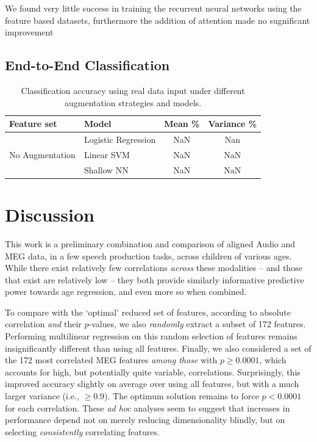 \documentclass[utf8]{frontiersSCNS} %
\begin{document}
We found very little success in training the recurrent neural networks using the feature based datasets, furthermore the addition of attention made no sugnificant improvement 
  

\subsection{End-to-End Classification}

\begin{table}[t]
  \centering
  \label{tab:end2end_results}
  \begin{tabular}{l l | c | c}
    \textbf{Feature set} & Model & \textbf{Mean \%} & \textbf{Variance \%} \\
    \toprule
    \multirow{3}{*}{No Augmentation}
    & Logistic Regression & NaN & Nan  \\
    & Linear SVM          & NaN & NaN  \\
    & Shallow NN          & NaN & NaN  \\
    \midrule

    \bottomrule
  \end{tabular}
  \caption{Classification accuracy using real data input under different augmentation strategies and models.}
\end{table}

\section{Discussion}


This work is a preliminary combination and comparison of aligned Audio and MEG data, in a few speech production tasks, across children of various ages. While there exist relatively few correlations {\em across} these modalities -- and those that exist are relatively low -- they both provide similarly informative predictive power towards age regression, and even more so when combined.

To compare with the `optimal' reduced set of features, according to absolute correlation {\em and} their $p$-values, we also {\em randomly} extract a subset of 172 features. Performing multilinear regression on this random selection of features remains insignificantly different than using all features. Finally, we also considered a set of the 172 most correlated MEG features {\em among those} with $p \geq 0.0001$, which accounts for high, but potentially quite variable, correlations. Surprisingly, this improved accuracy slightly on average over using all features, but with a much larger variance (i.e., $\geq 0.9$). The optimum solution remains to force $p<0.0001$ for each correlation. These {\em ad hoc} analyses seem to suggest that increases in performance depend not on merely reducing dimensionality blindly, but on selecting {\em consistently} correlating features.
\end{document}
